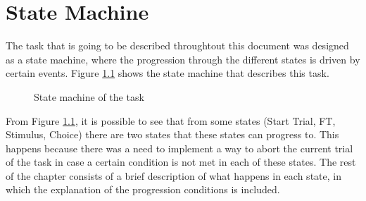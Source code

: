\chapter{State Machine}
\label{chap:state_machine}
The task that is going to be described throughtout this document was designed as a state machine, where the progression through the different states is driven by certain events. Figure \ref{fig:state_machine} shows the state machine that describes this task.

\begin{figure}[!ht]
    \centering
    \caption{State machine of the task}
    \label{fig:state_machine}
\end{figure}

From Figure \ref{fig:state_machine}, it is possible to see that from some states (Start Trial, FT, Stimulus, Choice) there are two states that these states can progress to. This happens because there was a need to implement a way to abort the current trial of the task in case a certain condition is not met in each of these states. The rest of the chapter consists of a brief description of what happens in each state, in which the explanation of the progression conditions is included.

